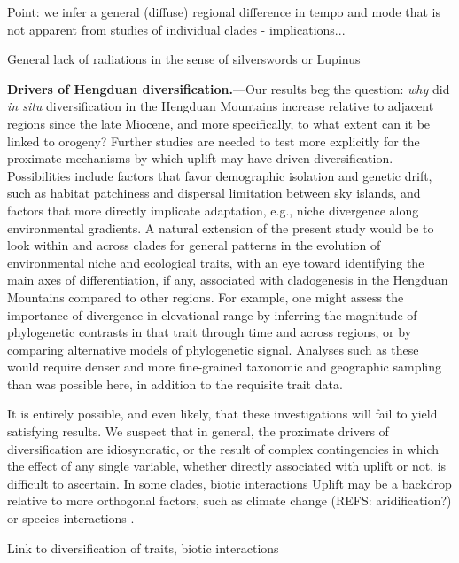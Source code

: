 Point: we infer a general (diffuse) regional difference in tempo and mode that is not apparent from studies of individual clades - implications...

General lack of radiations in the sense of silverswords or Lupinus


\textbf{Drivers of Hengduan diversification.}---Our results beg the question: \textit{why} did \textit{in situ} diversification in the Hengduan Mountains increase relative to adjacent regions since the late Miocene, and more specifically, to what extent can it be linked to orogeny? Further studies are needed to test more explicitly for the proximate mechanisms by which uplift may have driven diversification. Possibilities include factors that favor demographic isolation and genetic drift, such as habitat patchiness and dispersal limitation between sky islands, and factors that more directly implicate adaptation, e.g., niche divergence along environmental gradients. A natural extension of the present study would be to look within and across clades for general patterns in the evolution of environmental niche and ecological traits, with an eye toward identifying the main axes of differentiation, if any, associated with cladogenesis in the Hengduan Mountains compared to other regions. For example, one might assess the importance of divergence in elevational range by inferring the magnitude of phylogenetic contrasts in that trait through time and across regions, or by comparing alternative models of phylogenetic signal. Analyses such as these would require denser and more fine-grained taxonomic and geographic sampling than was possible here, in addition to the requisite trait data.

It is entirely possible, and even likely, that these investigations will fail to yield satisfying results. We suspect that in general, the proximate drivers of diversification are idiosyncratic, or the result of complex contingencies in which the effect of any single variable, whether directly associated with uplift or not, is difficult to ascertain. In some clades, biotic interactions Uplift may be a backdrop relative to more orthogonal factors, such as climate change (REFS: aridification?) or species interactions \citep[e.g.,][]{eaton2012}
. 

Link to diversification of traits, biotic interactions

